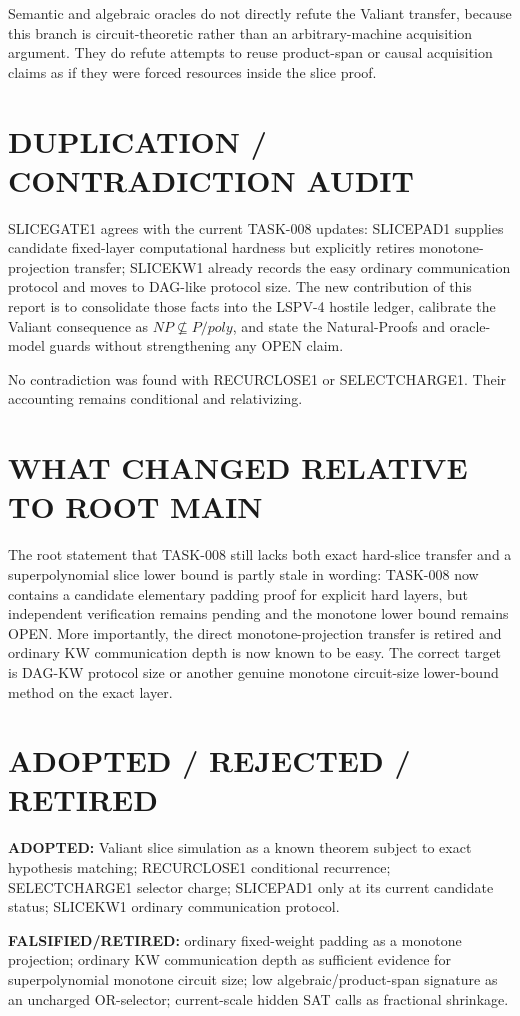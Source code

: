 \documentclass[11pt]{article}
\begin{document}
Semantic and algebraic oracles do not directly refute the Valiant transfer, because this branch is circuit-theoretic rather than an arbitrary-machine acquisition argument. They do refute attempts to reuse product-span or causal acquisition claims as if they were forced resources inside the slice proof.

\section*{DUPLICATION / CONTRADICTION AUDIT}
SLICEGATE1 agrees with the current TASK-008 updates: SLICEPAD1 supplies candidate fixed-layer computational hardness but explicitly retires monotone-projection transfer; SLICEKW1 already records the easy ordinary communication protocol and moves to DAG-like protocol size. The new contribution of this report is to consolidate those facts into the LSPV-4 hostile ledger, calibrate the Valiant consequence as $NP\not\subseteq P/poly$, and state the Natural-Proofs and oracle-model guards without strengthening any OPEN claim.

No contradiction was found with RECURCLOSE1 or SELECTCHARGE1. Their accounting remains conditional and relativizing.

\section*{WHAT CHANGED RELATIVE TO ROOT MAIN}
The root statement that TASK-008 still lacks both exact hard-slice transfer and a superpolynomial slice lower bound is partly stale in wording: TASK-008 now contains a candidate elementary padding proof for explicit hard layers, but independent verification remains pending and the monotone lower bound remains OPEN. More importantly, the direct monotone-projection transfer is retired and ordinary KW communication depth is now known to be easy. The correct target is DAG-KW protocol size or another genuine monotone circuit-size lower-bound method on the exact layer.

\section*{ADOPTED / REJECTED / RETIRED}
\textbf{ADOPTED:} Valiant slice simulation as a known theorem subject to exact hypothesis matching; RECURCLOSE1 conditional recurrence; SELECTCHARGE1 selector charge; SLICEPAD1 only at its current candidate status; SLICEKW1 ordinary communication protocol.

\textbf{FALSIFIED/RETIRED:} ordinary fixed-weight padding as a monotone projection; ordinary KW communication depth as sufficient evidence for superpolynomial monotone circuit size; low algebraic/product-span signature as an uncharged OR-selector; current-scale hidden SAT calls as fractional shrinkage.
\end{document}
